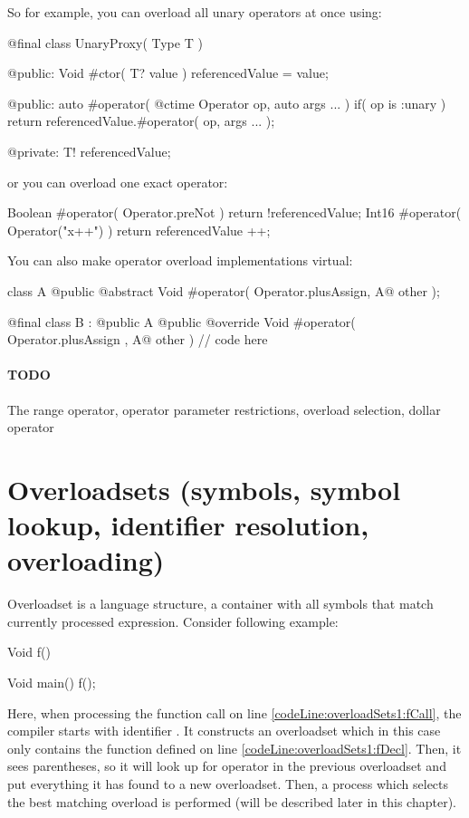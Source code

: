 So for example, you can overload all unary operators at once using:
\begin{code}
@final class UnaryProxy( Type T ) {
	
@public:
	Void #ctor( T? value ) {
		referencedValue = value;
	}
	
@public:
	auto #operator( @ctime Operator op, auto args ... )
		if( op is :unary )
	{
		return referencedValue.#operator( op, args ... );
	}
	
@private:
	T! referencedValue;
	
}
\end{code}

or you can overload one exact operator:
\begin{code}
Boolean #operator( Operator.preNot ) {
	return !referencedValue;	
}
Int16 #operator( Operator("x++") ) {
	return referencedValue ++;
}
\end{code}

You can also make operator overload implementations virtual:
\begin{code}
class A {
	@public @abstract Void #operator( Operator.plusAssign, A@ other );
}

@final class B : @public A {
	@public @override Void #operator( Operator.plusAssign , A@ other ) {
		// code here	
	}
}
\end{code}

\paragraph{TODO} The range operator, operator parameter restrictions, overload selection, dollar operator

\section{Overloadsets (symbols, symbol lookup, identifier resolution, overloading)}
Overloadset is a language structure, a container with all symbols that match currently processed expression. Consider following example:

\begin{code}
Void f() {}$\label{codeLine:overloadSets1:fDecl}$

Void main() {
	f();$\label{codeLine:overloadSets1:fCall}$	
}
\end{code}

Here, when processing the function call on line \ref{codeLine:overloadSets1:fCall}, the compiler starts with identifier . It constructs an overloadset which in this case only contains the function  defined on line \ref{codeLine:overloadSets1:fDecl}. Then, it sees parentheses, so it will look up for operator  in the previous overloadset and put everything it has found to a new overloadset. Then, a process which selects the best matching overload is performed (will be described later in this chapter).

